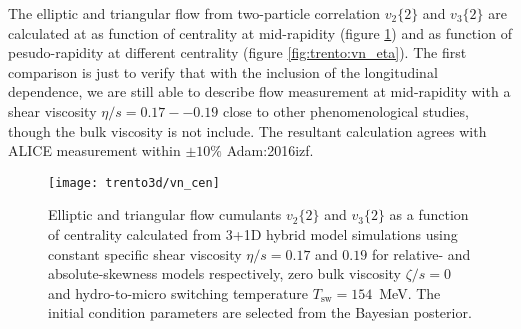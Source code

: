 The elliptic and triangular flow from two-particle correlation $v_2\{2\}$ and $v_3\{2\}$ are calculated at as function of centrality at mid-rapidity (figure \ref{fig:trento:vn_cen}) and as function of pesudo-rapidity at different centrality (figure \ref{fig:trento:vn_eta}).
The first comparison is just to verify that with the inclusion of the longitudinal dependence, we are still able to describe flow measurement at mid-rapidity with a shear viscosity $\eta/s = 0.17 -- 0.19$ close to other phenomenological studies, though the bulk viscosity is not include.
The resultant calculation agrees with ALICE measurement within $\pm 10\%$ {Adam:2016izf}.

\begin{figure}
\centering
\texttt{[image: trento3d/vn\_cen]}
\caption{Elliptic and triangular flow cumulants $v_2\{2\}$ and $v_3\{2\}$ as a function of centrality calculated from 3+1D hybrid model simulations using constant specific shear viscosity $\eta/s=0.17$ and $0.19$ for relative- and absolute-skewness models respectively, zero bulk viscosity $\zeta/s=0$ and hydro-to-micro switching temperature $T_\text{sw}=154$~MeV.
The initial condition parameters are selected from the Bayesian posterior.}
\label{fig:trento:vn_cen}
\end{figure}

